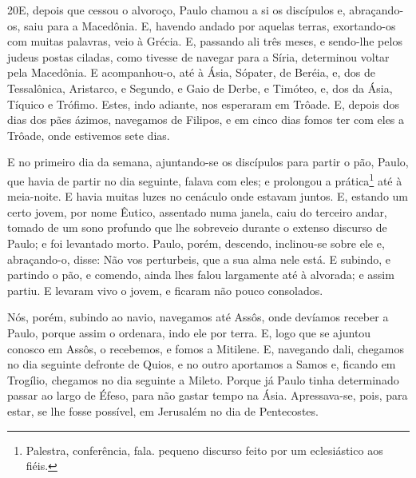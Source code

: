 \medskip

\lettrine{20} E, depois que cessou o alvoroço, Paulo chamou a
si os discípulos e, abraçando-os, saiu para a Macedônia. E,
havendo andado por aquelas terras, exortando-os com muitas palavras,
veio à Grécia. E, passando ali três meses, e sendo-lhe pelos
judeus postas ciladas, como tivesse de navegar para a Síria,
determinou voltar pela Macedônia. E acompanhou-o, até à Ásia,
Sópater, de Beréia, e, dos de Tessalônica, Aristarco, e Segundo, e
Gaio de Derbe, e Timóteo, e, dos da Ásia, Tíquico e Trófimo.
Estes, indo adiante, nos esperaram em Trôade. E, depois dos
dias dos pães ázimos, navegamos de Filipos, e em cinco dias fomos
ter com eles a Trôade, onde estivemos sete dias.

E no primeiro dia da semana, ajuntando-se os discípulos para
partir o pão, Paulo, que havia de partir no dia seguinte, falava com
eles; e prolongou a prática\footnote{Palestra, conferência, fala.
pequeno discurso feito por um eclesiástico aos fiéis.} até à
meia-noite. E havia muitas luzes no cenáculo onde estavam
juntos. E, estando um certo jovem, por nome Êutico, assentado
numa janela, caiu do terceiro andar, tomado de um sono profundo que
lhe sobreveio durante o extenso discurso de Paulo; e foi levantado
morto. Paulo, porém, descendo, inclinou-se sobre ele e,
abraçando-o, disse: Não vos perturbeis, que a sua alma nele está.
E subindo, e partindo o pão, e comendo, ainda lhes falou
largamente até à alvorada; e assim partiu. E levaram vivo o
jovem, e ficaram não pouco consolados.

Nós, porém, subindo ao navio, navegamos até Assôs, onde devíamos
receber a Paulo, porque assim o ordenara, indo ele por terra.
E, logo que se ajuntou conosco em Assôs, o recebemos, e fomos
a Mitilene. E, navegando dali, chegamos no dia seguinte
defronte de Quios, e no outro aportamos a Samos e, ficando em
Trogílio, chegamos no dia seguinte a Mileto. Porque já Paulo
tinha determinado passar ao largo de Éfeso, para não gastar tempo na
Ásia. Apressava-se, pois, para estar, se lhe fosse possível, em
Jerusalém no dia de Pentecostes.

